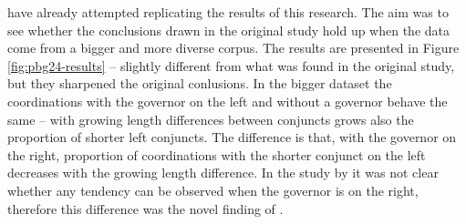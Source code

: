 \cite{prz:etal:24} have already attempted replicating the results of this research. The aim was to see whether the conclusions drawn in the original study hold up when the data come from a bigger and more diverse corpus. The results are presented in Figure \ref{fig:pbg24-results} -- slightly different from what was found in the original study, but they sharpened the original conlusions. In the bigger dataset the coordinations with the governor on the left and without a governor behave the same -- with growing length differences between conjuncts grows also the proportion of shorter left conjuncts. The difference is that, with the governor on the right, proportion of coordinations with the shorter conjunct on the left decreases with the growing length difference. In the study by \cite{prz:woz:23} it was not clear whether any tendency can be observed when the governor is on the right, therefore this difference was the novel finding of \cite{prz:etal:24}.

